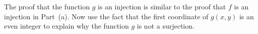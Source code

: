 \begin{list}{}
\item \begin{list}{\bf{(b)}}
\item The proof that the function $g$ is an injection is similar to the proof that $f$ is an injection in Part~(a).  Now use the fact that the first coordinate of $g(x, y)$ is an even integer to explain why the function $g$ is not a surjection.
\end{list}
\end{list}

\hbreak
\endinput



